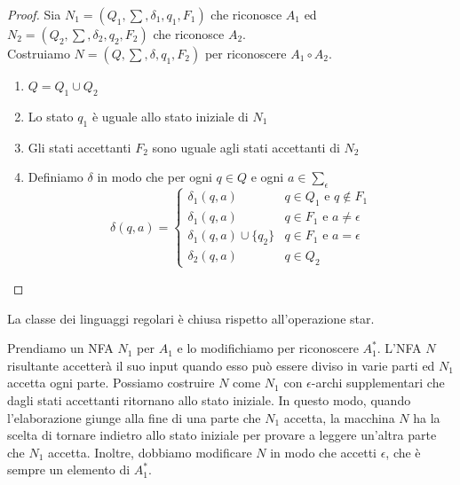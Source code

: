 \documentclass[12pt]{report}
\newcounter{theorem}
\begin{document}
	\begin{proof}
		Sia $N_1 = (Q_1, \sum, \delta_1, q_1, F_1)$ che riconosce $A_1$ ed $N_2 = (Q_2, \sum, \delta_2, q_2, F_2)$ che riconosce $A_2$. \\
		Costruiamo $N = (Q, \sum,\delta, q_1, F_2)$ per riconoscere $A_1 \circ A_2$.
		\begin{enumerate}
			\item $Q = Q_1 \cup Q_2$
			\item Lo stato $q_1$ è uguale allo stato iniziale di $N_1$
			\item Gli stati accettanti $F_2$ sono uguale agli stati accettanti di $N_2$
			\item Definiamo $\delta$ in modo che per ogni $q \in Q$ e ogni $a \in \sum_\epsilon$
			\[
			\delta(q, a) = \begin{cases}
				\delta_1(q, a) & q \in Q_1 \text{ e } q \notin F_1 \\
				\delta_1(q, a) & q \in F_1 \text{ e } a \neq \epsilon \\
				\delta_1(q, a) \cup \{q_2\} & q \in F_1 \text{ e } a = \epsilon \\
				\delta_2(q, a) & q \in Q_2
			\end{cases}
			\]
		\end{enumerate}
	\end{proof}
	\begin{theorem}{}{}
		La classe dei linguaggi regolari è chiusa rispetto all'operazione star.
	\end{theorem}
	Prendiamo un NFA $N_1$ per $A_1$ e lo modifichiamo per riconoscere $A_1^*$. L'NFA $N$ risultante accetterà il suo input quando esso può essere diviso in varie parti ed $N_1$ accetta ogni parte. Possiamo costruire $N$ come $N_1$ con $\epsilon$-archi supplementari che dagli stati accettanti ritornano allo stato iniziale. In questo modo, quando l'elaborazione giunge alla fine di una parte che $N_1$ accetta, la macchina $N$ ha la scelta di tornare indietro allo stato iniziale per provare a leggere un'altra parte che $N_1$ accetta. Inoltre, dobbiamo modificare $N$ in modo che accetti $\epsilon$, che è sempre un elemento di $A_1^*$.
\end{document}
